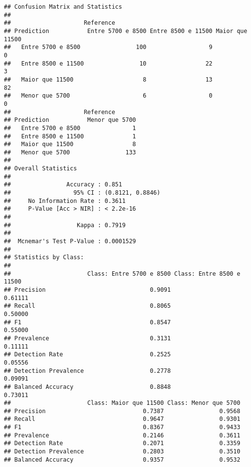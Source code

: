 \documentclass[
]{article}
\begin{document}
\begin{verbatim}
## Confusion Matrix and Statistics
## 
##                     Reference
## Prediction           Entre 5700 e 8500 Entre 8500 e 11500 Maior que 11500
##   Entre 5700 e 8500                100                  9               0
##   Entre 8500 e 11500                10                 22               3
##   Maior que 11500                    8                 13              82
##   Menor que 5700                     6                  0               0
##                     Reference
## Prediction           Menor que 5700
##   Entre 5700 e 8500               1
##   Entre 8500 e 11500              1
##   Maior que 11500                 8
##   Menor que 5700                133
## 
## Overall Statistics
##                                           
##                Accuracy : 0.851           
##                  95% CI : (0.8121, 0.8846)
##     No Information Rate : 0.3611          
##     P-Value [Acc > NIR] : < 2.2e-16       
##                                           
##                   Kappa : 0.7919          
##                                           
##  Mcnemar's Test P-Value : 0.0001529       
## 
## Statistics by Class:
## 
##                      Class: Entre 5700 e 8500 Class: Entre 8500 e 11500
## Precision                              0.9091                   0.61111
## Recall                                 0.8065                   0.50000
## F1                                     0.8547                   0.55000
## Prevalence                             0.3131                   0.11111
## Detection Rate                         0.2525                   0.05556
## Detection Prevalence                   0.2778                   0.09091
## Balanced Accuracy                      0.8848                   0.73011
##                      Class: Maior que 11500 Class: Menor que 5700
## Precision                            0.7387                0.9568
## Recall                               0.9647                0.9301
## F1                                   0.8367                0.9433
## Prevalence                           0.2146                0.3611
## Detection Rate                       0.2071                0.3359
## Detection Prevalence                 0.2803                0.3510
## Balanced Accuracy                    0.9357                0.9532
\end{verbatim}
\end{document}
